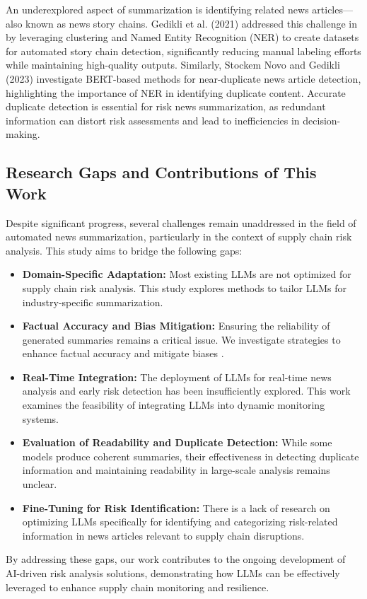 An underexplored aspect of summarization is identifying related news articles—also known as news story chains. Gedikli et al. (2021) addressed this challenge in \cite{Gedikli2021} by leveraging clustering and Named Entity Recognition (NER) to create datasets for automated story chain detection, significantly reducing manual labeling efforts while maintaining high-quality outputs. Similarly, Stockem Novo and Gedikli (2023) \cite{StockemNovo2023} investigate BERT-based methods for near-duplicate news article detection, highlighting the importance of NER in identifying duplicate content. Accurate duplicate detection is essential for risk news summarization, as redundant information can distort risk assessments and lead to inefficiencies in decision-making.

\subsection{Research Gaps and Contributions of This Work}

Despite significant progress, several challenges remain unaddressed in the field of automated news summarization, particularly in the context of supply chain risk analysis. This study aims to bridge the following gaps:

\begin{itemize}
  \item \textbf{Domain-Specific Adaptation:} Most existing LLMs are not optimized for supply chain risk analysis. This study explores methods to tailor LLMs for industry-specific summarization.
  \item \textbf{Factual Accuracy and Bias Mitigation:} Ensuring the reliability of generated summaries remains a critical issue. We investigate strategies to enhance factual accuracy and mitigate biases \cite{zhang2024benchmarking}.
  \item \textbf{Real-Time Integration:} The deployment of LLMs for real-time news analysis and early risk detection has been insufficiently explored. This work examines the feasibility of integrating LLMs into dynamic monitoring systems.
  \item \textbf{Evaluation of Readability and Duplicate Detection:} While some models produce coherent summaries, their effectiveness in detecting duplicate information and maintaining readability in large-scale analysis remains unclear.
  \item \textbf{Fine-Tuning for Risk Identification:} There is a lack of research on optimizing LLMs specifically for identifying and categorizing risk-related information in news articles relevant to supply chain disruptions.
\end{itemize}

By addressing these gaps, our work contributes to the ongoing development of AI-driven risk analysis solutions, demonstrating how LLMs can be effectively leveraged to enhance supply chain monitoring and resilience.